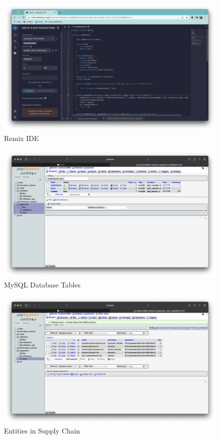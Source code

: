 \documentclass[12pt,a4paper,twocolumn,fleqn]{article}
\begin{document}
\begin{figure} [H]
\includegraphics[width=15cm]{media/Remix.png}
\centering
\caption{Remix IDE}
\end{figure}
\begin{figure} [H]
\includegraphics[width=15cm]{media/DBTables.png}
\centering
\caption{MySQL Database Tables}
\end{figure}
\begin{figure} [H]
\includegraphics[width=15cm]{media/DBUsers.png}
\centering
\caption{Entities in Supply Chain}
\end{figure}
\newpage
  \pagestyle{fancy}
  \thispagestyle{empty}
  \thispagestyle{plain}
  \fancyhf{}
  \chead{}
  \renewcommand{\headrulewidth}{0.4pt}%
\renewcommand{\footrulewidth}{0.4pt}%
\renewcommand{\footrulewidth}{0.4pt}%
\normalsize
\end{document}
